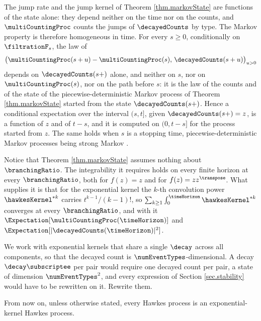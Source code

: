 The jump rate and the jump kernel of Theorem \ref{thm.markovState} are functions of the state alone:
they depend neither on the time nor on the counts,
and $\multiCountingProc$ counts the jumps of $\decayedCounts$ by type.
The Markov property is therefore homogeneous in time.
For every $s \geq 0$,
conditionally on $\filtrationF_{s}$,
the law of
\begin{equation*}
 \big( \multiCountingProc(s+u) - \multiCountingProc(s) , \,
 \decayedCounts(s+u) \big)_{u > 0}
\end{equation*}
depends on $\decayedCounts(s+)$ alone,
and neither on $s$, nor on $\multiCountingProc(s)$, nor on the path before $s$:
it is the law of the counts and of the state of the
piecewise-deterministic Markov process of Theorem \ref{thm.markovState}
started from the state $\decayedCounts(s+)$.
Hence a conditional expectation over the interval $(s,t]$,
given $\decayedCounts(s+) = z$,
is a function of $z$ and of $t-s$,
and it is computed on $(0, t-s]$ for the process started from $z$.
The same holds when $s$ is a stopping time,
piecewise-deterministic Markov processes being strong Markov \cite{Dav84pie}.

\begin{remark}\label{remark.noSubcriticality}
 Notice that Theorem \ref{thm.markovState} assumes nothing about $\branchingRatio$.
 The integrability it requires holds on every finite horizon at every $\branchingRatio$,
 both for $f(z) = z$ and for $f(z) = z z^{\transpose}$.
 What supplies it is that for the exponential kernel the $k$-th convolution power
 $\hawkesKernel^{*k}$ carries $t^{k-1}/(k-1)!$,
 so $\sum_{k \geq 1}\int_{0}^{\timeHorizon}\hawkesKernel^{*k}$ converges at every
 $\branchingRatio$, and with it $\Expectation[\multiCountingProc(\timeHorizon)]$ and
 $\Expectation[\lvert\decayedCounts(\timeHorizon)\rvert^{2}]$.
\end{remark}

\begin{exercise}\label{exercise.eventDependentDecays}
 We work with exponential kernels that share a single $\decay$ across all components,
 so that the decayed count is $\numEventTypes$-dimensional.
 A decay $\decay\subscriptee$ per pair would require one decayed count per pair,
 a state of dimension $\numEventTypes^2$,
 and every expression of Section \ref{sec.stability} would have to be rewritten on it.
 Rewrite them.
\end{exercise}

From now on, unless otherwise stated,
every Hawkes process is an exponential-kernel Hawkes process.

